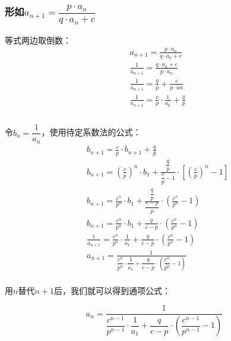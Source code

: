 \documentclass[UTF8]{ctexart}
\begin{document}
\subsubsection[形如{\large $a_{n+1}=(p\cdot a_n)/(q\cdot a_n+c)$}]{形如{\large$a_{n+1}=\dfrac{p\cdot a_n}{q\cdot a_n+c}$}}
    等式两边取倒数：
    \setcounter{equation}{0}
    \begin{align}
        &a_{n+1}=\frac{p\cdot a_n}{q\cdot a_n+c}\\[3mm]
        &\frac{1}{a_{n+1}}=\frac{q\cdot a_n+c}{p\cdot a_n}\\[3mm]
        &\frac{1}{a_{n+1}}=\frac{q}{p}+\frac{c}{p\cdot an}\\[3mm]
        &\frac{1}{a_{n+1}}=\frac{c}{p}\cdot\frac{1}{a_{n}}+\frac{q}{p}\\[3mm]
    \end{align}\\
    令$b_n=\dfrac{1}{a_n}$，使用待定系数法的公式：
    \begin{align}
        &b_{n+1}=\frac{c}{p}\cdot b_{n+1}+\frac{q}{p}\\[3mm]
        &b_{n+1}=\left(\frac{c}{p}\right)^n\cdot b_1+\frac{\dfrac{q}{p}}{\dfrac{c}{p}-1}\cdot\left[\left(\frac{c}{p}\right)^n-1\right]\\[3mm]
        &b_{n+1}=\frac{c^n}{p^n}\cdot b_1+\frac{\dfrac{q}{p}}{\dfrac{c-p}{p}}\cdot\left(\frac{c^n}{p^n}-1\right)\\[3mm]
        &b_{n+1}=\frac{c^n}{p^n}\cdot b_1+\frac{q}{c-p}\cdot\left(\frac{c^n}{p^n}-1\right)\\[3mm]
        &\frac{1}{a_{n+1}}=\frac{c^n}{p^n}\cdot\frac{1}{a_1}+\frac{q}{c-p}\cdot\left(\frac{c^n}{p^n}-1\right)\\[3mm]
        &a_{n+1}=\frac{1}{\dfrac{c^n}{p^n}\cdot\dfrac{1}{a_1}+\dfrac{q}{c-p}\cdot\left(\dfrac{c^n}{p^n}-1\right)}
    \end{align}\\
    用$n$替代$n+1$后，我们就可以得到通项公式：\\
    \begin{large}
    \begin{equation*}
        a_{n}=\frac{1}{\dfrac{c^{n-1}}{p^{n-1}}\cdot\dfrac{1}{a_1}+\dfrac{q}{c-p}\cdot\left(\dfrac{c^{n-1}}{p^{n-1}}-1\right)}
    \end{equation*}
    \end{large}
\newpage
\end{document}
